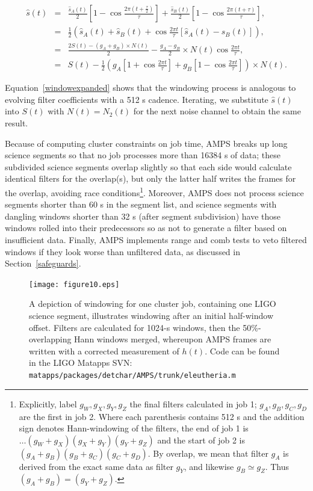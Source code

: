 	\begin{eqnarray}
        \hat{s} (t) &=& \frac{\hat{s}_A (t)}{2} \left[1 - \cos \frac{2 \pi (t+\frac{\tau}{2})}{\tau} \right] + \frac{\hat{s}_B (t)}{2}\left[1 - \cos \frac{2 \pi (t+\tau)}{\tau} \right] \label{windowexpand}, \\
	  &=& \frac{1}{2} \left( \hat{s}_A (t) + \hat{s}_B (t) + \cos \frac{2 \pi t}{\tau} \left[\hat{s}_A (t) - \hat{s}_B (t) \right]\right),\\
	&=& \frac{2 S(t) - (g_{A} + g_{B})\times N(t)}{2} - \frac{g_{A} - g_{B}}{2} \times N(t) \cos \frac{2 \pi t}{\tau},\\
          &=& S(t) - \frac{1}{2} \left( g_{A} \left [1 + \cos \frac{2 \pi t}{\tau} \right] + g_{B} \left [1 - \cos \frac{2 \pi t}{\tau} \right] \right) \times N (t) \label{windowexpanded}.
	\end{eqnarray}

	Equation~\ref{windowexpanded} shows that the windowing process is analogous to evolving filter coefficients with a 512 s cadence. Iterating, we substitute $\hat{s}(t)$ into $S(t)$ with $N(t) = N_2(t)$ for the next noise channel to obtain the same result.

            Because of computing cluster constraints on job time, AMPS breaks up long science segments so that no job processes more than 16384 s of data; these subdivided science segments overlap slightly so that each side would calculate identical filters for the overlap(s), but only the latter half writes the frames for the overlap, avoiding race conditions\footnote{Explicitly, label $g_W, g_X, g_Y, g_Z$ the final filters calculated in job 1; $g_A, g_B, g_C, g_D$ are the first in job 2. Where each parenthesis contains 512 s and the addition sign denotes Hann-windowing of the filters, the end of job 1 is $\ldots(g_W+g_X)(g_X+g_Y)(g_Y+g_Z)$ and the start of job 2 is $(g_A+g_B)(g_B+g_C)(g_C+g_D)$. By overlap, we mean that filter $g_A$ is derived from the exact same data as filter $g_Y$, and likewise $g_B \simeq g_Z$. Thus $(g_A+g_B)=(g_Y+g_Z)$.}. Moreover, AMPS does not process science segments shorter than 60 s in the segment list, and science segments with dangling windows shorter than 32 s (after segment subdivision) have those windows rolled into their predecessors so as not to generate a filter based on insufficient data. Finally, AMPS implements range and comb tests to veto filtered windows if they look worse than unfiltered data, as discussed in Section~\ref{safeguards}. 

\begin{figure}
\begin{center}
\texttt{[image: figure10.eps]}
\caption{A depiction of windowing for one cluster job, containing one LIGO science segment, illustrates windowing after an initial half-window offset. Filters are calculated for 1024-s windows, then the 50\%-overlapping Hann windows merged, whereupon AMPS frames are written with a corrected measurement of $h(t)$. Code can be found in the LIGO Matapps SVN: \texttt{matapps/packages/detchar/AMPS/trunk/eleutheria.m}}
\label{windowingScience}
\end{center}
\end{figure}


